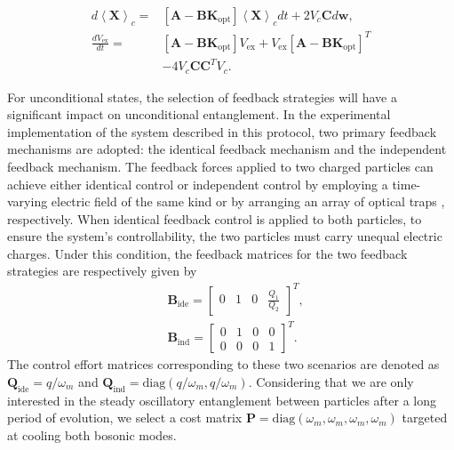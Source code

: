 \documentclass[
aps,
reprint,
superscriptaddress,
amsmath,amssymb,
pra
]{revtex4-2}
\begin{document}
\begin{align}
   d{{\left\langle \mathbf X \right\rangle }_{c}}  = & \left[\mathbf A-\mathbf{BK}_\text{opt} \right]{{\left\langle \mathbf X \right\rangle }_{c}}dt+2{{V }_{c}} \mathbf Cd\mathbf w, \nonumber \\ 
  \frac{d{{V }_\text{ex}}}{dt}  =& \left[\mathbf A-\mathbf{BK}_\text{opt} \right]{{V }_\text{ex}}+{{V }_\text{ex}}{{\left[\mathbf A-\mathbf{BK}_\text{opt} \right]}^{T}} \nonumber  \\ 
  &-4{{V }_{c}}\mathbf C{\mathbf{C}^{T}}{{V }_{c}}.
\end{align}

For unconditional states, the selection of feedback strategies will have a significant impact on unconditional entanglement. In the experimental implementation of the system described in this protocol, two primary feedback mechanisms are adopted: the identical feedback mechanism and the independent feedback mechanism. The feedback forces applied to two charged particles can achieve either identical control or independent control by employing a time-varying electric field of the same kind \cite{doi:10.1126/science.abp9941, Deplano:24, PhysRevResearch.5.013070, Bykov:23} or by arranging an array of optical traps \cite{vijayan2023scalable, reisenbauer2024non, PhysRevApplied.20.024018}, respectively. When identical feedback control is applied to both particles, to ensure the system's controllability, the two particles must carry unequal electric charges. Under this condition, the feedback matrices for the two feedback strategies are respectively given by
\begin{align}
  & {\mathbf{B}_{\text{ide}}}={{\left[ \begin{matrix}
   0 & 1 & 0 & \frac{Q_1}{Q_2}
\end{matrix} \right]}^{T}}, \nonumber  \\ 
 & {\mathbf{B}_{\text{ind}}}={{\left[ \begin{matrix}
   0 & 1 & 0 & 0  \\
   0 & 0 & 0 & 1  
\end{matrix} \right]}^{T}}.
\end{align}
The control effort matrices corresponding to these two scenarios are denoted as $\mathbf Q_\text{ide}=q/\omega_m$ and $\mathbf Q_\text{ind}= \text{diag}(q/\omega_m, q/\omega_m)$. Considering that we are only interested in the steady oscillatory entanglement between particles after a long period of evolution, we select a cost matrix $\mathbf P= \text{diag}(\omega_m, \omega_m, \omega_m, \omega_m)$ targeted at cooling both bosonic modes.
\end{document}
